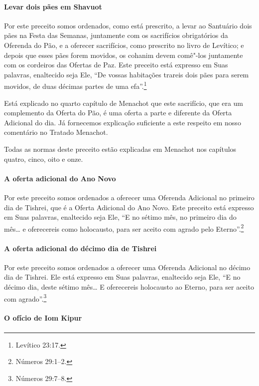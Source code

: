 \begin{multicols}{2}
\paragraph{Levar dois pães em Shavuot\starr}

Por este preceito somos ordenados, como está prescrito, a levar ao
Santuário dois pães na Festa das Semanas, juntamente com os sacrifícios
obrigatórios da Oferenda do Pão, e a oferecer sacrifícios, como
prescrito no livro de Levítico; e depois que esses pães forem movidos,
os cohanim\starr{} devem comê"-los juntamente com os cordeiros das Ofertas de
Paz. Este preceito está expresso em Suas palavras, enaltecido seja Ele,
``De vossas habitações trareis dois pães para serem movidos, de duas
décimas partes de uma efa\starr''.\footnote{Levítico 23:17.}

Está explicado no quarto capítulo de Menachot\starr{} que este sacrifício, que
era um complemento da Oferta do Pão, é uma oferta a parte e diferente da
Oferta Adicional do dia. Já fornecemos explicação suficiente a este
respeito em nosso comentário no Tratado Menachot\starr.

Todas as normas deste preceito estão explicadas em Menachot\starr{} nos capítulos
quatro, cinco, oito e onze.

\paragraph{A oferta adicional do Ano Novo}

Por este preceito somos ordenados a oferecer uma Oferenda Adicional no
primeiro dia de Tishrei\starr, que é a Oferta Adicional do Ano Novo. Este
preceito está expresso em Suas palavras, enaltecido seja Ele, ``E no
sétimo mês, no primeiro dia do mês\ldots{} e oferecereis como holocausto,
para ser aceito com agrado pelo Eterno''.\footnote{Números 29:1--2.}

\paragraph{A oferta adicional do décimo dia de Tishrei\starr}

Por este preceito somos ordenados a oferecer uma Oferenda Adicional no
décimo dia de Tishrei\starr. Ele está expresso em Suas palavras,
enaltecido seja Ele, ``E no décimo dia, deste sétimo mês\ldots{} E
oferecereis holocausto ao Eterno, para ser aceito com agrado''.\footnote{Números
29:7--8.}

\paragraph{O ofício de Iom Kipur\starr}


\end{multicols}
